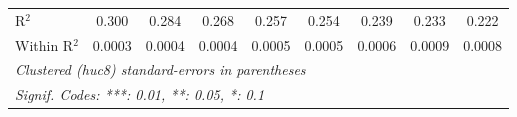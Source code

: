 \begin{tabular}{lcccccccc}
   R$^2$                                          & 0.300                    & 0.284                    & 0.268                    & 0.257                    & 0.254                    & 0.239                    & 0.233                    & 0.222\\  
   Within R$^2$                                   & 0.0003                   & 0.0004                   & 0.0004                   & 0.0005                   & 0.0005                   & 0.0006                   & 0.0009                   & 0.0008\\  
   \midrule \midrule
   \multicolumn{9}{l}{\emph{Clustered (huc8) standard-errors in parentheses}}\\
   \multicolumn{9}{l}{\emph{Signif. Codes: ***: 0.01, **: 0.05, *: 0.1}}\\
\end{tabular}
\par\endgroup



